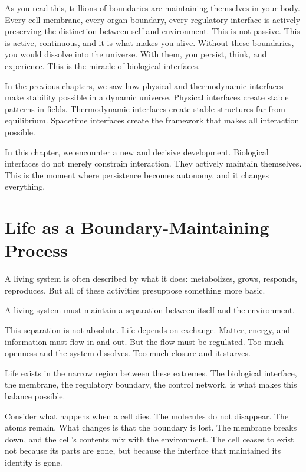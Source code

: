 \documentclass[
  openright]{book}
\begin{document}
As you read this, trillions of boundaries are maintaining themselves in
your body. Every cell membrane, every organ
boundary, every regulatory interface is actively preserving the
distinction between self and environment. This is not passive. This is
active, continuous, and it is what makes you alive. Without these
boundaries, you would dissolve into the universe. With them, you
persist, think, and experience. This is the miracle of biological
interfaces.

In the previous chapters, we saw how physical and thermodynamic
interfaces make stability possible in a dynamic universe. Physical
interfaces create stable patterns in fields. Thermodynamic interfaces
create stable structures far from equilibrium. Spacetime interfaces
create the framework that makes all interaction possible.

In this chapter, we encounter a new and decisive development. Biological
interfaces do not merely constrain interaction. They actively maintain
themselves. This is the moment where persistence becomes autonomy, and
it changes everything.

\section{Life as a Boundary-Maintaining
Process}\label{life-as-a-boundary-maintaining-process}

A living system is often described by what it does: metabolizes, grows,
responds, reproduces. But all of these activities presuppose something
more basic.

A living system must maintain a separation between itself and the
environment.

This separation is not absolute. Life depends on exchange. Matter,
energy, and information must flow in and out. But the flow must be
regulated. Too much openness and the system dissolves.
Too much closure and it starves.

Life exists in the narrow region between these extremes. The biological
interface, the membrane, the regulatory boundary, the control network,
is what makes this balance possible.

Consider what happens when a cell dies. The molecules do not
disappear. The atoms remain. What changes is that the boundary is lost.
The membrane breaks down, and the cell's contents mix
with the environment. The cell ceases to exist not because its parts are
gone, but because the interface that maintained its identity is gone.
\end{document}
